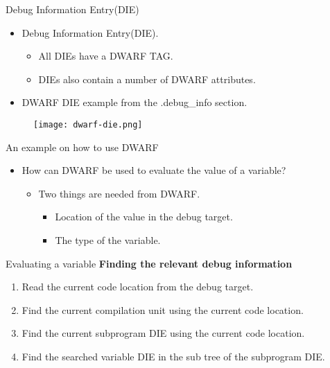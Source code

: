 
\begin{frame}{Debug Information Entry(DIE)}
	\begin{itemize}
	    \item Debug Information Entry(DIE).
		\begin{itemize}
	    		\item All DIEs have a DWARF TAG.
	    		\item DIEs also contain a number of DWARF attributes.
		\end{itemize}
	    \item DWARF DIE example from the .debug\_info section.
	\end{itemize}
	\begin{figure}
		\texttt{[image: dwarf-die.png]}
	\end{figure}
\end{frame}


\begin{frame}{An example on how to use DWARF}
	\begin{itemize}
	    \item How can DWARF be used to evaluate the value of a variable?
		\begin{itemize}
		    \item Two things are needed from DWARF.
			\begin{itemize}
			    \item Location of the value in the debug target.
			    \item The type of the variable.
			\end{itemize}
		\end{itemize}
	\end{itemize}
\end{frame}


\begin{frame}{Evaluating a variable}
	\textbf{Finding the relevant debug information}
	\begin{enumerate}
		\item Read the current code location from the debug target.
		\item Find the current compilation unit using the current code location.
		\item Find the current subprogram DIE using the current code location.
		\item Find the searched variable DIE in the sub tree of the subprogram DIE. 
	\end{enumerate}
\end{frame}

